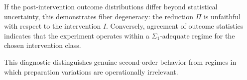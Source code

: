 If the post-intervention outcome distributions differ beyond statistical uncertainty, this
demonstrates fiber degeneracy: the reduction $\Pi$ is unfaithful with respect to the intervention
$I$. Conversely, agreement of outcome statistics indicates that the experiment operates within
a $\Sigma_1$-adequate regime for the chosen intervention class.

This diagnostic distinguishes genuine second-order behavior from regimes in which preparation
variations are operationally irrelevant.